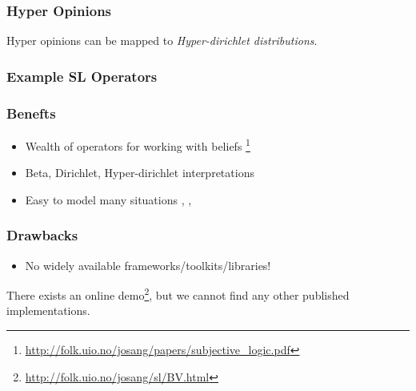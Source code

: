 \documentclass{beamer}
\begin{document}

\begin{frame}
\frametitle{Hyper Opinions}

Hyper opinions can be mapped to \emph{Hyper-dirichlet distributions}.

\end{frame}



\begin{frame}
\frametitle{Example SL Operators}


\end{frame}


\begin{frame}
\frametitle{Benefts}

\begin{itemize}
  \item Wealth of operators for working with beliefs
     \footnote{\url{http://folk.uio.no/josang/papers/subjective_logic.pdf}}
  \item Beta, Dirichlet, Hyper-dirichlet interpretations
  \item Easy to model many situations
    \cite{josang2008conditional}, \cite{josang2006trust}, \cite{kent2010application}
\end{itemize}

\end{frame}


\begin{frame}
\frametitle{Drawbacks}

\begin{itemize}
  \item No widely available frameworks/toolkits/libraries!
\end{itemize}

There exists an online demo\footnote{\url{http://folk.uio.no/josang/sl/BV.html}},
but we cannot find any other published implementations.

\end{frame}
\end{document}
